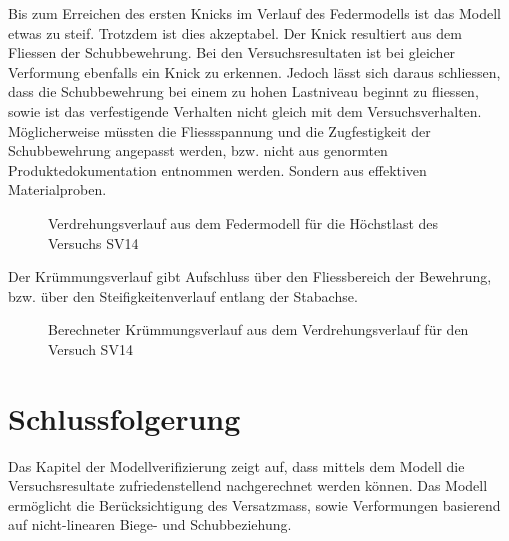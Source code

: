 \documentclass[
  11pt,
  letterpaper,
]{scrreprt}
\begin{document}
Bis zum Erreichen des ersten Knicks im Verlauf des Federmodells ist das
Modell etwas zu steif. Trotzdem ist dies akzeptabel. Der Knick
resultiert aus dem Fliessen der Schubbewehrung. Bei den
Versuchsresultaten ist bei gleicher Verformung ebenfalls ein Knick zu
erkennen. Jedoch lässt sich daraus schliessen, dass die Schubbewehrung
bei einem zu hohen Lastniveau beginnt zu fliessen, sowie ist das
verfestigende Verhalten nicht gleich mit dem Versuchsverhalten.
Möglicherweise müssten die Fliessspannung und die Zugfestigkeit der
Schubbewehrung angepasst werden, bzw. nicht aus genormten
Produktedokumentation entnommen werden. Sondern aus effektiven
Materialproben.

\begin{figure}[H]


\caption{\label{fig-phi-max-sv14}Verdrehungsverlauf aus dem Federmodell
für die Höchstlast des Versuchs SV14}

\end{figure}%

Der Krümmungsverlauf gibt Aufschluss über den Fliessbereich der
Bewehrung, bzw. über den Steifigkeitenverlauf entlang der Stabachse.

\begin{figure}[H]


\caption{\label{fig-chi-max-sv14}Berechneter Krümmungsverlauf aus dem
Verdrehungsverlauf für den Versuch SV14}

\end{figure}%

\section{Schlussfolgerung}\label{schlussfolgerung}

Das Kapitel der Modellverifizierung zeigt auf, dass mittels dem Modell
die Versuchsresultate zufriedenstellend nachgerechnet werden können. Das
Modell ermöglicht die Berücksichtigung des Versatzmass, sowie
Verformungen basierend auf nicht-linearen Biege- und Schubbeziehung.
\end{document}
